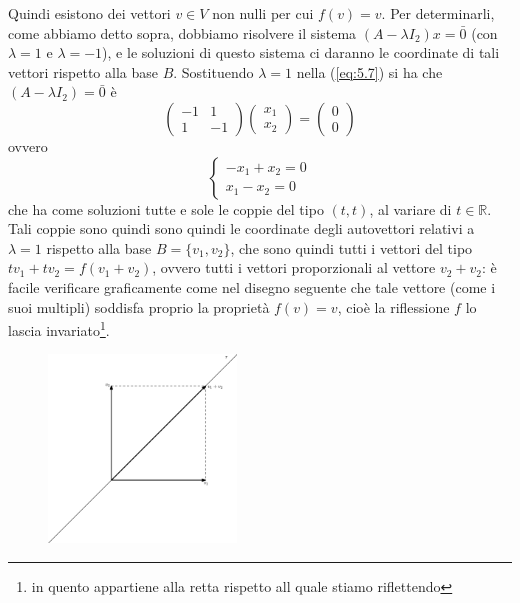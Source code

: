 \documentclass{book}
\begin{document}
Quindi esistono dei vettori $v\in V$ non nulli per cui $f(v)=v$. Per determinarli, come abbiamo detto sopra,
dobbiamo risolvere il sistema $(A-\lambda I_2)x = \bar{0}$ (con $\lambda=1$ e $\lambda=-1$), e le soluzioni di
questo sistema ci daranno le coordinate di tali vettori rispetto alla base $B$.
Sostituendo $\lambda=1$ nella (\ref{eq:5.7}) si ha che $(A-\lambda I_2)=\bar{0}$ è
\begin{equation*}
  \begin{pmatrix}
    -1 & 1\\
    1 & -1
  \end{pmatrix}
  \begin{pmatrix}
    x_1\\
    x_2
  \end{pmatrix}=
  \begin{pmatrix}
    0\\
    0
  \end{pmatrix}
\end{equation*}
ovvero
\begin{equation*}
  \begin{cases}
    -x_1+x_2=0\\
    x_1-x_2=0
  \end{cases}
\end{equation*}
che ha come soluzioni tutte e sole le coppie del tipo $(t,t)$, al variare di $t\in \mathds{R}$. Tali coppie sono
quindi sono quindi le coordinate degli autovettori relativi a $\lambda=1$ rispetto alla base $B=\{v_1,v_2\}$, che
sono quindi tutti i vettori del tipo $tv_1+tv_2=f(v_1+v_2)$, ovvero tutti i vettori proporzionali al vettore
$v_2+v_2$: è facile verificare graficamente come nel disegno seguente che tale vettore (come i suoi multipli)
soddisfa proprio la proprietà $f(v)=v$, cioè la riflessione $f$ lo lascia invariato\footnote{in quento appartiene
alla retta rispetto all quale stiamo riflettendo}.
\begin{figure}[ht]
  \centering
  \includegraphics[width=5cm]{img/finiti/imgex5-2-1.eps}
\end{figure}
\end{document}
